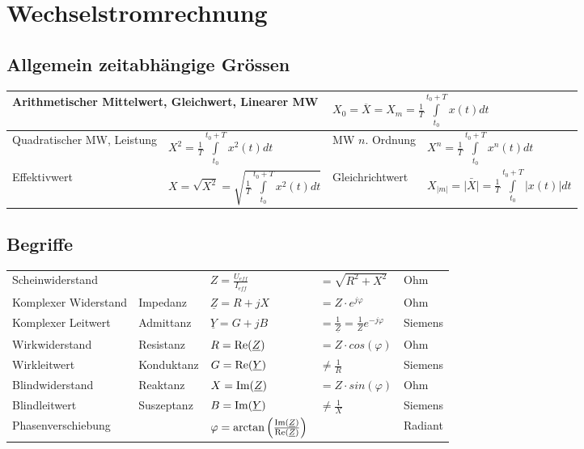 \section{Wechselstromrechnung}
	\subsection{Allgemein zeitabhängige Grössen}
	\begin{tabular}{|ll|ll|}
    \hline
	\multicolumn{2}{|l}{Arithmetischer Mittelwert, Gleichwert, Linearer MW} 
	    	& \multicolumn{2}{l|}{$X_0 = \overline{X} = X_m = \frac {1} {T} \int\limits_{t_0}^{t_0+T}
	    	x(t)dt$} \\
	\hline
	Quadratischer MW, Leistung 
		& $X^2 = \frac {1} {T} \int\limits_{t_0}^{t_0+T} x^2(t)dt$ 
		& MW $n$. Ordnung
		& $X^n = \frac {1} {T} \int\limits_{t_0}^{t_0+T} x^n(t)dt$ \\
	\hline
	Effektivwert 
		& $X = \sqrt{X^2} = \sqrt{\frac{1}{T} \int\limits ^{t_0+T}_{t_0}{x^2(t)dt}}$
		& Gleichrichtwert 
		& $X_{|m|} = \bar{|X|} = \frac{1}{T} \int\limits_{t_0}^{t_0+T}{|x(t)| dt}$ \\
	\hline
   	\end{tabular}

	\subsection{Begriffe}
		\begin{tabular}{lllll}
		Scheinwiderstand & & $Z = \frac{U_{eff}}{I_{eff}} $ & $ = \sqrt{R^2+X^2}$ &
		Ohm\\ Komplexer Widerstand & Impedanz & $\underline Z = R + jX $ & $ = Z \cdot
		e^{j \varphi}$ & Ohm\\
		Komplexer Leitwert & Admittanz & $\underline Y = G + jB $ & $ =
		\frac{1}{\underline Z} = \frac{1}{Z}e^{-j\varphi}$ & Siemens\\
		Wirkwiderstand & Resistanz & $R = \operatorname{Re}(\underline Z) $ & $ = Z
		\cdot cos(\varphi)$ & Ohm\\
		Wirkleitwert & Konduktanz & $G = \operatorname{Re}(\underline Y) $ & $ \neq \frac{1}{R}$ &
		Siemens\\
		Blindwiderstand & Reaktanz & $X = \operatorname{Im}(\underline Z) $ & $ = Z
		\cdot sin(\varphi)$ & Ohm\\
		Blindleitwert & Suszeptanz & $B = \operatorname{Im}( \underline Y) $ & $ \neq \frac{1}{X}$
		& Siemens\\
		Phasenverschiebung & & $\varphi =
		\arctan\left(\frac{\operatorname{Im}(\underline{Z})}{\operatorname{Re}(\underline{Z})}\right)$ & &
		Radiant\\
		
		\end{tabular}
	
